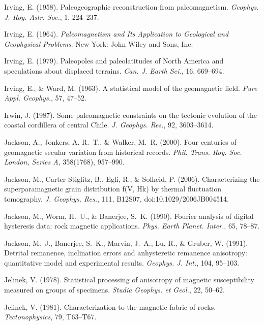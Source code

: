 \documentclass[,plain]{tauxe}
\begin{document}
\begin{thebibliography}{}
\bibitem{}%
Irving, E. (1958).
Paleogeographic reconstruction from paleomagnetism.
{\it Geophys. J. Roy. Astr. Soc.}, 1, 224--237.

\bibitem{}%
Irving, E. (1964).
{\it Paleomagnetism and Its Application to Geological and Geophysical Problems}.
New York: John Wiley and Sons, Inc.

\bibitem{}%
Irving, E. (1979).
Paleopoles and paleolatitudes of North America and speculations about displaced terrains.
{\it Can. J. Earth Sci.}, 16, 669--694.

\bibitem{}%
Irving, E., \& Ward, M. (1963).
A statistical model of the geomagnetic field.
{\it Pure Appl. Geophys.}, 57, 47--52.

\bibitem{}%
Irwin, J. (1987).
Some paleomagnetic constraints on the tectonic evolution of the coastal cordillera of central Chile.
{\it J. Geophys. Res.}, 92, 3603--3614.

\bibitem{}%
Jackson, A., Jonkers, A. R.~T., \& Walker, M.~R. (2000).
Four centuries of geomagnetic secular variation from historical records.
{\it Phil. Trans. Roy. Soc. London, Series A}, 358(1768), 957--990.

\bibitem{}%
Jackson, M., Carter-Stiglitz, B., Egli, R., \& Solheid, P. (2006).
Characterizing the superparamagnetic grain distribution f(V, Hk) by thermal fluctuation tomography.
{\it J. Geophys. Res.}, 111, B12S07, doi:10.1029/2006JB004514.

\bibitem{}%
Jackson, M., Worm, H.~U., \& Banerjee, S.~K. (1990).
Fourier analysis of digital hysteresis data: rock magnetic applications.
{\it Phys. Earth Planet. Inter.}, 65, 78--87.

\bibitem{}%
Jackson, M.~J., Banerjee, S.~K., Marvin, J.~A., Lu, R., \& Gruber, W. (1991).
Detrital remanence, inclination errors and anhysteretic remanence anisotropy: quantitative model and experimental results.
{\it Geophys. J. Int.}, 104, 95--103.

\bibitem{}%
Jelinek, V. (1978).
Statistical processing of anisotropy of magnetic susceptibility measured on groups of specimens.
{\it Studia Geophys. et Geol.}, 22, 50--62.

\bibitem{}%
Jelinek, V. (1981).
Characterization to the magnetic fabric of rocks.
{\it Tectonophysics}, 79, T63--T67.


\end{thebibliography}
\end{document}
